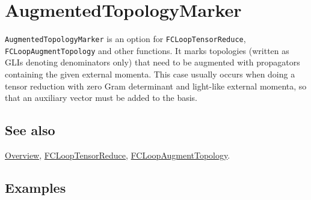 \documentclass[../FeynCalcManual.tex]{subfiles}
\begin{document}
\hypertarget{augmentedtopologymarker}{
\section{AugmentedTopologyMarker}\label{augmentedtopologymarker}}

\texttt{AugmentedTopologyMarker} is an option for
\texttt{FCLoopTensorReduce}, \texttt{FCLoopAugmentTopology} and other
functions. It marks topologies (written as GLIs denoting denominators
only) that need to be augmented with propagators containing the given
external momenta. This case usually occurs when doing a tensor reduction
with zero Gram determinant and light-like external momenta, so that an
auxiliary vector must be added to the basis.

\subsection{See also}

\hyperlink{toc}{Overview},
\hyperlink{fclooptensorreduce}{FCLoopTensorReduce},
\hyperlink{fcloopaugmenttopology}{FCLoopAugmentTopology}.

\subsection{Examples}
\end{document}
